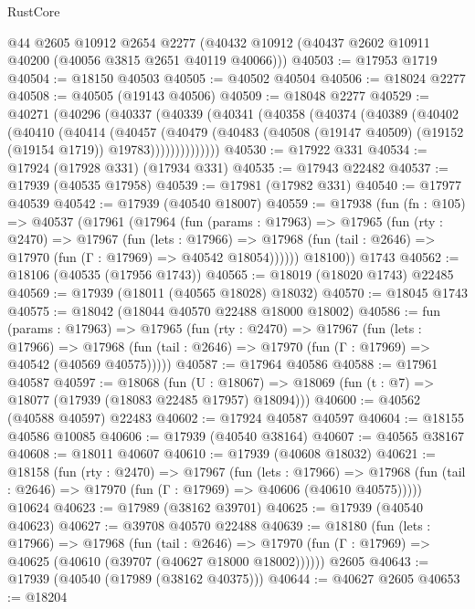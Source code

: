 \begin{lexlean}{RustCore}
\begin{coremodule}
    @44
    @2605
    @10912
    @2654
    @2277
    (@40432 @10912 (@40437 @2602 @10911 @40200 (@40056 @3815 @2651 @40119 @40066)))
@40503 := @17953 @1719
@40504 := @18150 @40503
@40505 := @40502 @40504
@40506 := @18024 @2277
@40508 := @40505 (@19143 @40506)
@40509 := @18048 @2277
@40529 := @40271
    (@40296
      (@40337
        (@40339
          (@40341
            (@40358
              (@40374
                (@40389
                  (@40402
                    (@40410
                      (@40414
                        (@40457
                          (@40479
                            (@40483
                              (@40508 (@19147 @40509) (@19152 (@19154 @1719)) @19783))))))))))))))
@40530 := @17922 @331
@40534 := @17924 (@17928 @331) (@17934 @331)
@40535 := @17943 @22482
@40537 := @17939 (@40535 @17958)
@40539 := @17981 (@17982 @331)
@40540 := @17977 @40539
@40542 := @17939 (@40540 @18007)
@40559 := @17938
    (fun (fn : @105) =>
    @40537
      (@17961
        (@17964
          (fun (params : @17963) =>
          @17965
            (fun (rty : @2470) =>
            @17967
              (fun (lets : @17966) =>
              @17968 (fun (tail : @2646) => @17970 (fun (Γ : @17969) => @40542 @18054))))))
        @18100))
    @1743
@40562 := @18106 (@40535 (@17956 @1743))
@40565 := @18019 (@18020 @1743) @22485
@40569 := @17939 (@18011 (@40565 @18028) @18032)
@40570 := @18045 @1743
@40575 := @18042 (@18044 @40570 @22488 @18000 @18002)
@40586 := fun (params : @17963) =>
  @17965
    (fun (rty : @2470) =>
    @17967
      (fun (lets : @17966) =>
      @17968 (fun (tail : @2646) => @17970 (fun (Γ : @17969) => @40542 (@40569 @40575)))))
@40587 := @17964 @40586
@40588 := @17961 @40587
@40597 := @18068
    (fun (U : @18067) => @18069 (fun (t : @7) => @18077 (@17939 (@18083 @22485 @17957) @18094)))
@40600 := @40562 (@40588 @40597) @22483
@40602 := @17924 @40587 @40597
@40604 := @18155 @40586 @10085
@40606 := @17939 (@40540 @38164)
@40607 := @40565 @38167
@40608 := @18011 @40607
@40610 := @17939 (@40608 @18032)
@40621 := @18158
    (fun (rty : @2470) =>
    @17967
      (fun (lets : @17966) =>
      @17968 (fun (tail : @2646) => @17970 (fun (Γ : @17969) => @40606 (@40610 @40575)))))
    @10624
@40623 := @17989 (@38162 @39701)
@40625 := @17939 (@40540 @40623)
@40627 := @39708 @40570 @22488
@40639 := @18180
    (fun (lets : @17966) =>
    @17968
      (fun (tail : @2646) =>
      @17970 (fun (Γ : @17969) => @40625 (@40610 (@39707 (@40627 @18000 @18002))))))
    @2605
@40643 := @17939 (@40540 (@17989 (@38162 @40375)))
@40644 := @40627 @2605
@40653 := @18204

\end{coremodule}
\end{lexlean}
